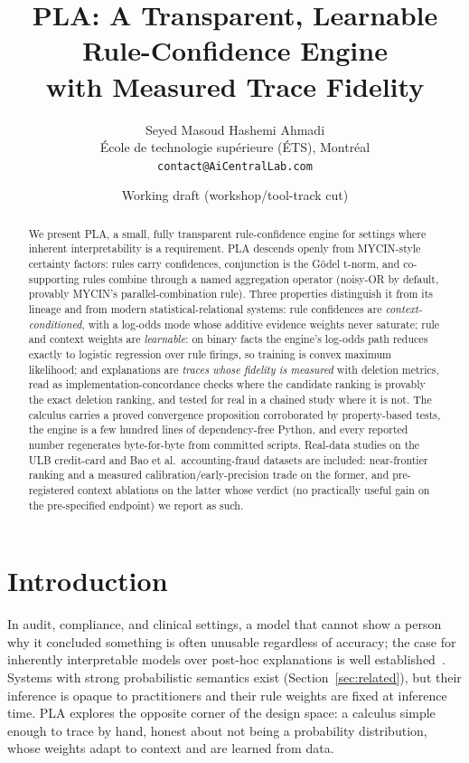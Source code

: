 \documentclass[10pt]{article}
\title{PLA: A Transparent, Learnable Rule-Confidence Engine\\
with Measured Trace Fidelity}
\author{Seyed Masoud Hashemi Ahmadi\\
\small École de technologie supérieure (ÉTS), Montréal\\
\small \texttt{contact@AiCentralLab.com}}
\date{Working draft (workshop/tool-track cut)}
\begin{document}
\maketitle

\begin{abstract}
We present PLA, a small, fully transparent rule-confidence engine for
settings where inherent interpretability is a requirement. PLA descends
openly from MYCIN-style certainty factors: rules carry confidences,
conjunction is the G\"odel t-norm, and co-supporting rules combine through
a named aggregation operator (noisy-OR by default, provably MYCIN's
parallel-combination rule). Three properties distinguish it from its
lineage and from modern statistical-relational systems: rule confidences
are \emph{context-conditioned}, with a log-odds mode whose additive
evidence weights never saturate; rule and context weights are
\emph{learnable}: on binary facts the engine's log-odds path reduces
exactly to logistic regression over rule firings, so training is convex
maximum likelihood; and explanations are \emph{traces whose fidelity is
measured} with deletion metrics, read as implementation-concordance
checks where the candidate ranking is provably the exact deletion
ranking, and tested for real in a chained study where it is not.
The calculus carries a proved convergence proposition corroborated by
property-based tests, the engine is
a few hundred lines of dependency-free Python, and every reported number
regenerates byte-for-byte from committed scripts. Real-data studies on the
ULB credit-card and Bao et al.\ accounting-fraud datasets are included:
near-frontier ranking and a measured calibration/early-precision trade
on the former, and
pre-registered context ablations on the latter whose verdict (no
practically useful gain on the pre-specified endpoint) we report as
such.
\end{abstract}

\section{Introduction}
In audit, compliance, and clinical settings, a model that cannot show a
person why it concluded something is often unusable regardless of
accuracy; the case for inherently interpretable models over post-hoc
explanations is well established~\cite{rudin2019}. Systems with strong
probabilistic semantics exist (Section~\ref{sec:related}), but their
inference is opaque to practitioners and their rule weights are fixed at
inference time. PLA explores the opposite corner of the design space: a
calculus simple enough to trace by hand, honest about not being a
probability distribution, whose weights adapt to context and are learned
from data.
\end{document}

